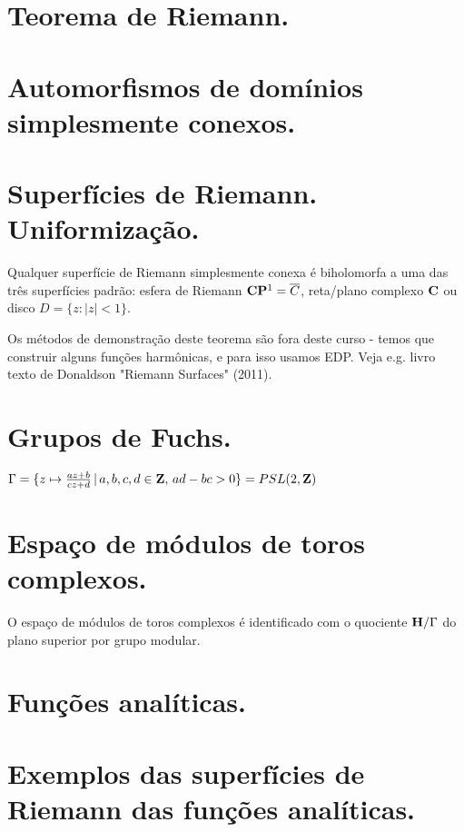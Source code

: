 \section{Teorema de Riemann.}

\section{Automorfismos de domínios simplesmente conexos.}

\section{Superfícies de Riemann. Uniformização.}

\begin{teorema}
Qualquer superfície de Riemann simplesmente conexa é biholomorfa a uma das três superfícies padrão:
esfera de Riemann $\mathbf{C}\mathbf{P}^1 = \overline{C}$, reta/plano complexo $\mathbf{C}$ ou disco $D = \{z : |z|<1\}$.
\end{teorema}
Os métodos de demonstração deste teorema são fora deste curso - temos que construir alguns funções
harmônicas, e para isso usamos EDP. Veja e.g. livro texto de Donaldson "Riemann Surfaces" (2011).

\section{Grupos de Fuchs.}

\begin{exem}
$\Gamma = \{ z \mapsto \frac{az+b}{cz+d} \,|\, a,b,c,d\in\mathbf{Z}, \, ad-bc>0 \} = PSL(2,\mathbf{Z})$
\end{exem}

\section{Espaço de módulos de toros complexos.}

\begin{teorema}
O espaço de módulos de toros complexos é identificado com o quociente $\mathbf{H}/\Gamma$
do plano superior por grupo modular.
\end{teorema}

\section{Funções analíticas.}

\section{Exemplos das superfícies de Riemann das funções analíticas.}
